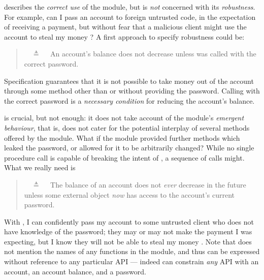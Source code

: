     \vspace{.05in}
 
\Scorrect  describes  {the \emph{correct use} of the module, but is \emph{not} concerned with its \emph{robustness}.}
{For example, can I pass an account to foreign untrusted code, in the expectation of receiving a payment,
but without fear that a malicious client might use the account to steal my money \cite{ELang}?}
 A first approach to specify robustness could be:
 

\begin{quote}
\SrobustA\ \ $\triangleq$ \ \ An account's balance does not decrease unless  was called 
with the correct password.
\end{quote}

Specification \SrobustA %
{guarantees} that it is not possible to  take money out of the account through some method other than 
{or without providing the password}.
  Calling    with the  correct password is 
a \emph{necessary condition} for reducing the account's  balance.

\SrobustA is  crucial, but  not   enough:
it does not take  account of the module's \emph{emergent behaviour},
{that is, does not cater for the potential interplay of several methods offered by the module.}
 What if the module provided further methods which leaked the password,  
 {or allowed for it to be arbitrarily changed}?
{ While no single procedure call is capable of breaking the intent of \SrobustA, a sequence of calls might.}
{What} we really need is
 \begin{quote}
\SrobustB\ \ $\triangleq$ \ \ The balance of an account does not {\emph{ever}} decrease in the future unless some external 
object  {\emph{now}} has access to the account's current password.
\end{quote}
With \SrobustB, I can confidently pass my account to some untrusted client who
 does not have
 knowledge of the password; they may or may not make the payment I was expecting, but I
 know they will not  {be able to} steal my money \cite{ooToSecurity,miller-esop2013}.
 Note that \SrobustB  does not mention
 the names of any functions in the module, and 
 thus can be expressed without reference to any particular API ---
 indeed \SrobustB can constrain \emph{any} API with an account, an account
 balance, and a password.

\vspace{.04in}


